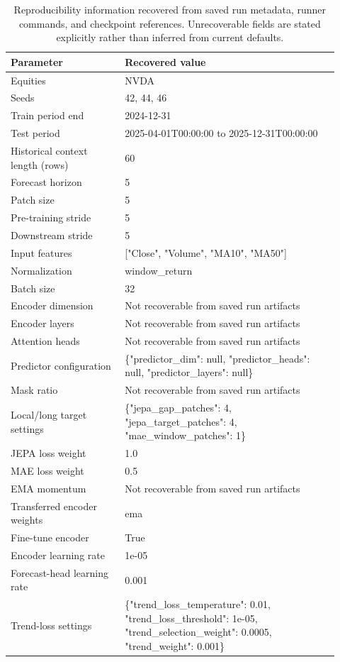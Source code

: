 \begin{table}[p]
\centering
\small
\caption{Reproducibility information recovered from saved run metadata, runner commands, and checkpoint references. Unrecoverable fields are stated explicitly rather than inferred from current defaults.}
\label{tab:reproducibility}
\begin{tabular}{p{0.32\linewidth}p{0.60\linewidth}}
\toprule
Parameter & Recovered value \\
\midrule
Equities & NVDA \\
Seeds & 42, 44, 46 \\
Train period end & 2024-12-31 \\
Test period & 2025-04-01T00:00:00 to 2025-12-31T00:00:00 \\
Historical context length (rows) & 60 \\
Forecast horizon & 5 \\
Patch size & 5 \\
Pre-training stride & 5 \\
Downstream stride & 5 \\
Input features & ["Close", "Volume", "MA10", "MA50"] \\
Normalization & window\_return \\
Batch size & 32 \\
Encoder dimension & Not recoverable from saved run artifacts \\
Encoder layers & Not recoverable from saved run artifacts \\
Attention heads & Not recoverable from saved run artifacts \\
Predictor configuration & \{"predictor\_dim": null, "predictor\_heads": null, "predictor\_layers": null\} \\
Mask ratio & Not recoverable from saved run artifacts \\
Local/long target settings & \{"jepa\_gap\_patches": 4, "jepa\_target\_patches": 4, "mae\_window\_patches": 1\} \\
JEPA loss weight & 1.0 \\
MAE loss weight & 0.5 \\
EMA momentum & Not recoverable from saved run artifacts \\
Transferred encoder weights & ema \\
Fine-tune encoder & True \\
Encoder learning rate & 1e-05 \\
Forecast-head learning rate & 0.001 \\
Trend-loss settings & \{"trend\_loss\_temperature": 0.01, "trend\_loss\_threshold": 1e-05, "trend\_selection\_weight": 0.0005, "trend\_weight": 0.001\} \\

\end{tabular}
\end{table}
